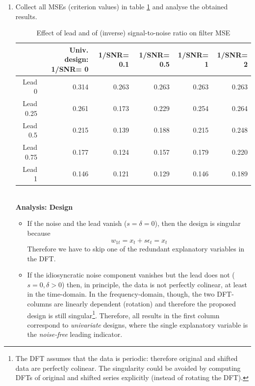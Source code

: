 \documentclass[a4paper]{book}
\begin{document}
\begin{enumerate}
\begin{Schunk}
\end{Schunk}
\item Collect all MSEs (criterion values) in table \ref{lead_snr_mat} and analyse the obtained results.
\begin{table}[ht]
\centering
\begin{tabular}{rrrrrr}
  \hline
 & Univ. design: 1/SNR= 0  & 1/SNR= 0.1  & 1/SNR= 0.5  & 1/SNR= 1  & 1/SNR= 2  \\ 
  \hline
Lead  0  & 0.314 & 0.263 & 0.263 & 0.263 & 0.263 \\ 
  Lead  0.25  & 0.261 & 0.173 & 0.229 & 0.254 & 0.264 \\ 
  Lead  0.5  & 0.215 & 0.139 & 0.188 & 0.215 & 0.248 \\ 
  Lead  0.75  & 0.177 & 0.124 & 0.157 & 0.179 & 0.220 \\ 
  Lead  1  & 0.146 & 0.121 & 0.129 & 0.146 & 0.189 \\ 
   \hline
\end{tabular}
\caption{Effect of lead and of (inverse) signal-to-noise ratio on filter MSE} 
\label{lead_snr_mat}
\end{table}\\
\textbf{Analysis: Design}
\begin{itemize}
\item If the noise and the lead vanish ($s=\delta=0$), then the design is singular because 
\[w_{1t}=x_t+s\epsilon_t=x_t
\]
Therefore we have to skip one of the redundant explanatory variables in the DFT.
\item If the idiosyncratic noise component vanishes but the lead does not ($s=0, \delta>0$) then, in principle, the data is not perfectly colinear, at least in the time-domain. In the frequency-domain, though, the two DFT-columns are linearly dependent (rotation) and therefore the proposed design is still singular\footnote{The DFT assumes that the data is periodic: therefore original and shifted data are perfectly colinear. The singularity could be avoided by computing DFTs of original and shifted series explicitly (instead of rotating the DFT).}. Therefore, all results in the first column correspond to \emph{univariate} designs, where the single explanatory variable is the \emph{noise-free} leading indicator.

\end{itemize}
\end{enumerate}
\end{document}
